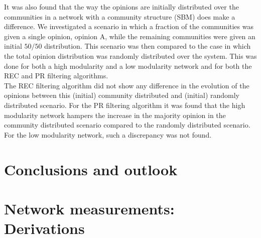 \documentclass[11 pt , letterpaper , twoside , openright]{book}
\begin{document}
\newline
It was also found that the way the opinions are initially distributed over the communities in a network with a community structure (SBM) does make a difference. We investigated a scenario in which a fraction of the communities was given a single opinion, opinion A, while the remaining communities were given an initial $50/50$ distribution. This scenario was then compared to the case in which the total opinion distribution was randomly distributed over the system. This was done for both a high modularity and a low modularity network and for both the REC and PR filtering algorithms. \\
\newline
The REC filtering algorithm did not show any difference in the evolution of the opinions between this (initial) community distributed and (initial) randomly distributed scenario. For the PR filtering algorithm it was found that the high modularity network hampers the increase in the majority opinion in the community distributed scenario compared to the randomly distributed scenario. For the low modularity network, such a discrepancy was not found.\\




\chapter{Conclusions and outlook}
\newpage

\pagestyle{fancy}
\fancyhf{}
\lhead{\textcolor{NavyBlue}{\appendixname} \ \textcolor{NavyBlue}{\thechapter}}
\rhead{\rightmark}
\cfoot{\thepage}

\appendix
\addappheadtotoc 

\chapter{Network measurements: Derivations}
\end{document}
